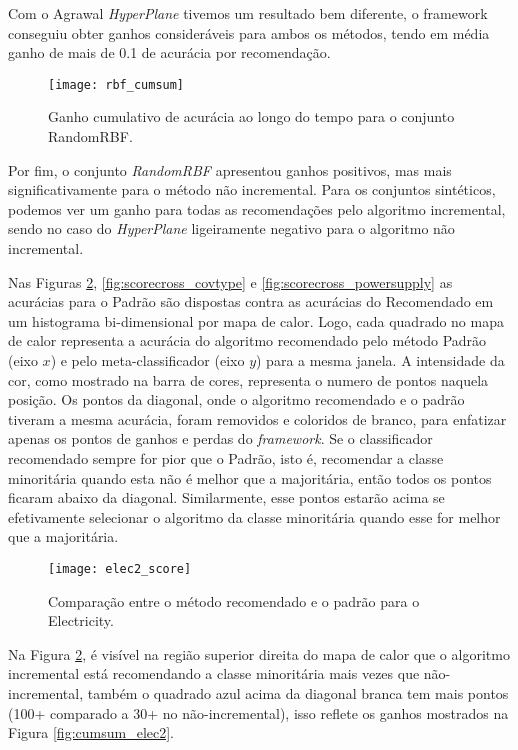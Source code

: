 Com o Agrawal \textit{HyperPlane} tivemos um resultado bem diferente, o framework conseguiu obter ganhos consideráveis para ambos os métodos, tendo em média ganho de mais de 0.1 de acurácia por recomendação.

\begin{figure}[!t]
    \centering
    \texttt{[image: rbf\_cumsum]}
    \caption{Ganho cumulativo de acurácia ao longo do tempo para o conjunto RandomRBF.}
    \label{fig:cumsum_rbf}
\end{figure}

Por fim, o conjunto \textit{RandomRBF} apresentou ganhos positivos, mas mais significativamente para o método não incremental. Para os conjuntos sintéticos, podemos ver um ganho para todas as recomendações pelo algoritmo incremental, sendo no caso do \textit{HyperPlane} ligeiramente negativo para o algoritmo não incremental.

Nas Figuras \ref{fig:scorecross_elec2}, \ref{fig:scorecross_covtype} e \ref{fig:scorecross_powersupply} as acurácias para o Padrão são dispostas contra as acurácias do Recomendado em um histograma bi-dimensional por mapa de calor. Logo, cada quadrado no mapa de calor representa a acurácia do algoritmo recomendado pelo método Padrão (eixo $x$) e pelo meta-classificador (eixo $y$) para a mesma janela. A intensidade da cor, como mostrado na barra de cores, representa o numero de pontos naquela posição. Os pontos da diagonal, onde o algoritmo recomendado e o padrão tiveram a mesma acurácia, foram removidos e coloridos de branco, para enfatizar apenas os pontos de ganhos e perdas do \textit{framework}. Se o classificador recomendado sempre for pior que o Padrão, isto é, recomendar a classe minoritária quando esta não é melhor que a majoritária, então todos os pontos ficaram abaixo da diagonal. Similarmente, esse pontos estarão acima se efetivamente selecionar o algoritmo da classe minoritária quando esse for melhor que a majoritária.

\begin{figure}[!t]
    \centering
    \texttt{[image: elec2\_score]}
    \caption{Comparação entre o método recomendado e o padrão para o Electricity.}
    \label{fig:scorecross_elec2}
\end{figure}

Na Figura \ref{fig:scorecross_elec2}, é visível na região  superior direita do mapa de calor que o algoritmo incremental está recomendando a classe minoritária mais vezes que não-incremental, também o quadrado azul acima da diagonal branca tem mais pontos (100+ comparado a 30+ no não-incremental), isso reflete os ganhos mostrados na Figura \ref{fig:cumsum_elec2}.

